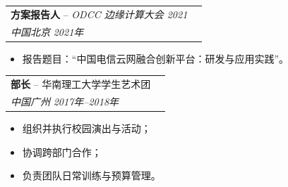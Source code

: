 \noindent
\begin{tabularx}{\textwidth}{@{}Xr@{}}
\textbf{方案报告人} -- \textit{ODCC 边缘计算大会 2021} \\
\textit{中国北京} \hfill \textit{2021年}
\end{tabularx}
\begin{itemize}[leftmargin=*]
  \item 报告题目：“中国电信云网融合创新平台：研发与应用实践”。
\end{itemize}

\noindent
\begin{tabularx}{\textwidth}{@{}Xr@{}}
\textbf{部长} -- 华南理工大学学生艺术团\\
\textit{中国广州}  \hfill \textit{2017年--2018年}
\end{tabularx}
\begin{itemize}[leftmargin=*]
  \item 组织并执行校园演出与活动；
  \item 协调跨部门合作；
  \item 负责团队日常训练与预算管理。
\end{itemize}
